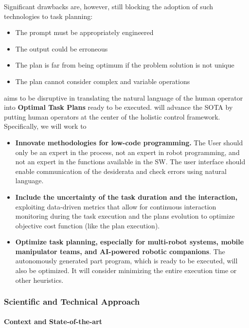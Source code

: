 Significant drawbacks are, however, still blocking the adoption of such
technologies to task planning:

\begin{itemize}
\item
  The prompt must be appropriately engineered
\item
  The output could be erroneous
\item
  The plan is far from being optimum if the problem solution is not
  unique
\item
  The plan cannot consider complex and variable operations
\end{itemize}

 aims to be disruptive in translating the natural
language of the human operator into \textbf{Optimal Task Plans} ready to
be executed.  will advance the SOTA by putting human
operators at the center of the holistic control framework. Specifically,
we will work to

\begin{itemize}[compact]
\item
  \textbf{Innovate methodologies for low-code programming.} The User
  should only be an expert in the process, not an expert in robot
  programming, and not an expert in the functions available in the SW.
  The user interface should enable communication of the desiderata and
  check errors using natural language.
\item
  \textbf{Include the uncertainty of the task duration and the
  interaction,} exploiting data-driven metrics that allow for continuous
  interaction monitoring during the task execution and the
  plan\textquotesingle s evolution to optimize objective cost function
  (like the plan execution).
\item
  \textbf{Optimize task planning, especially for multi-robot systems,
  mobile manipulator teams, and AI-powered robotic companions}. The
  autonomously generated part program, which is ready to be executed,
  will also be optimized. It will consider minimizing the entire
  execution time or other heuristics.
\end{itemize}

\subsubsection{Scientific and Technical
Approach}\label{scientific-and-technical-approach}

\paragraph{Context and
State-of-the-art}\label{context-and-state-of-the-art}

